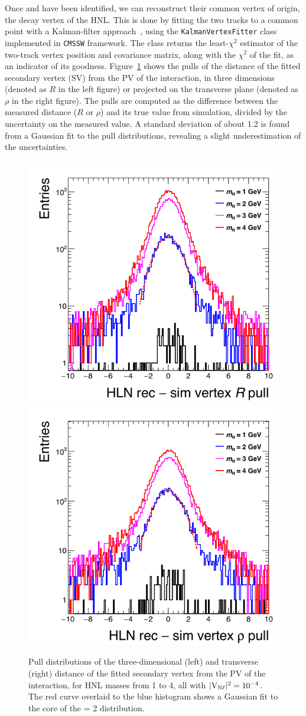 Once \ltwo and \lthree have been identified, we can reconstruct their
common vertex of origin, \ie the decay vertex of the HNL. This is done
by fitting the two tracks to a common point with a Kalman-filter
approach~\cite{kvfTwiki},
using the
\texttt{KalmanVertexFitter} class implemented in \texttt{CMSSW} framework.
The class returns the least-$\chi^2$ estimator of the two-track vertex
position and covariance matrix, along with the $\chi^2$ of the fit, as
an indicator of its goodness.
Figure~\ref{fig:svPulls} shows the pulls of the distance of the fitted
secondary vertex (SV) from the PV of the interaction, in three
dimensions (denoted as $R$ in the left figure) or projected on the
transverse plane (denoted as $\rho$ in the right figure). The pulls
are computed as the difference between the measured distance ($R$ or
$\rho$) and its true value from simulation, divided by the uncertainty
on the measured value. A standard deviation of about 1.2 is found from
a Gaussian fit to the pull distributions, revealing a slight
underestimation of the uncertainties.
\begin{figure}[h!]
  \centering
  \includegraphics[width=.34\textwidth]{Figures/c6/selection/leptons_fromN_fromNW_vtx_r_pull.png}
  \includegraphics[width=.34\textwidth]{Figures/c6/selection/leptons_fromN_fromNW_vtx_rho_pull.png}
  \caption{Pull distributions of the three-dimensional (left) and
    transverse (right) distance of the fitted secondary vertex from
    the PV of the interaction, for HNL masses from 1 to 4\GeV,
    all with $\mathrm{|V_{\mathrm{N}\ell}|^2}=10^{-4}$. The red curve overlaid to the blue
    histogram shows a Gaussian fit to the core of the \mhnl= 2\GeV
    distribution.}
  \label{fig:svPulls}
\end{figure}
